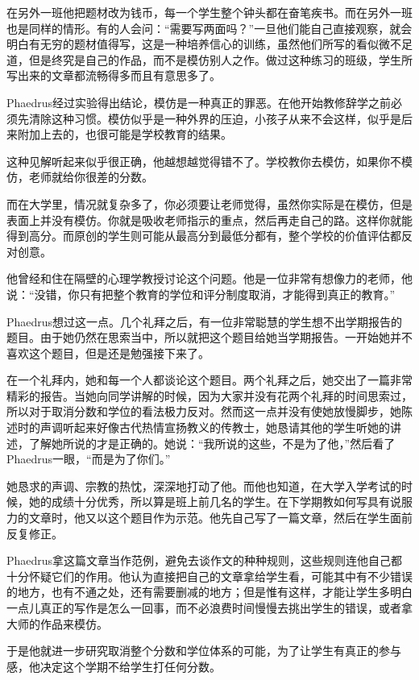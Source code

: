 \documentclass[UTF8]{article}
\begin{document}
\par 在另外一班他把题材改为钱币，每一个学生整个钟头都在奋笔疾书。而在另外一班也是同样的情形。有的人会问：“需要写两面吗？”一旦他们能自己直接观察，就会明白有无穷的题材值得写，这是一种培养信心的训练，虽然他们所写的看似微不足道，但是终究是自己的作品，而不是模仿别人之作。做过这种练习的班级，学生所写出来的文章都流畅得多而且有意思多了。
\par Phaedrus经过实验得出结论，模仿是一种真正的罪恶。在他开始教修辞学之前必须先清除这种习惯。模仿似乎是一种外界的压迫，小孩子从来不会这样，似乎是后来附加上去的，也很可能是学校教育的结果。
\par 这种见解听起来似乎很正确，他越想越觉得错不了。学校教你去模仿，如果你不模仿，老师就给你很差的分数。
\par 而在大学里，情况就复杂多了，你必须要让老师觉得，虽然你实际是在模仿，但是表面上并没有模仿。你就是吸收老师指示的重点，然后再走自己的路。这样你就能得到高分。而原创的学生则可能从最高分到最低分都有，整个学校的价值评估都反对创意。
\par 他曾经和住在隔壁的心理学教授讨论这个问题。他是一位非常有想像力的老师，他说：“没错，你只有把整个教育的学位和评分制度取消，才能得到真正的教育。”
\par Phaedrus想过这一点。几个礼拜之后，有一位非常聪慧的学生想不出学期报告的题目。由于她仍然在思索当中，所以就把这个题目给她当学期报告。一开始她并不喜欢这个题目，但是还是勉强接下来了。
\par 在一个礼拜内，她和每一个人都谈论这个题目。两个礼拜之后，她交出了一篇非常精彩的报告。当她向同学讲解的时候，因为大家并没有花两个礼拜的时间思索过，所以对于取消分数和学位的看法极力反对。然而这一点并没有使她放慢脚步，她陈述时的声调听起来好像古代热情宣扬教义的传教士，她恳请其他的学生听她的讲述，了解她所说的才是正确的。她说：“我所说的这些，不是为了他，”然后看了Phaedrus一眼，“而是为了你们。”
\par 她恳求的声调、宗教的热忱，深深地打动了他。而他也知道，在大学入学考试的时候，她的成绩十分优秀，所以算是班上前几名的学生。在下学期教如何写具有说服力的文章时，他又以这个题目作为示范。他先自己写了一篇文章，然后在学生面前反复修正。
\par Phaedrus拿这篇文章当作范例，避免去谈作文的种种规则，这些规则连他自己都十分怀疑它们的作用。他认为直接把自己的文章拿给学生看，可能其中有不少错误的地方，也有不通之处，还有需要删减的地方；但是惟有这样，才能让学生多明白一点儿真正的写作是怎么一回事，而不必浪费时间慢慢去挑出学生的错误，或者拿大师的作品来模仿。
\par 于是他就进一步研究取消整个分数和学位体系的可能，为了让学生有真正的参与感，他决定这个学期不给学生打任何分数。
\end{document}
